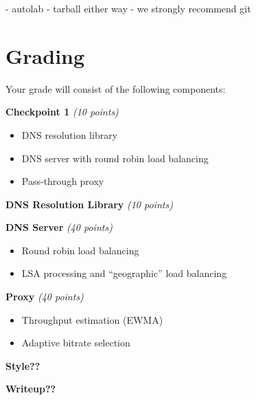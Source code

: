 \documentclass{article}
\begin{document}
- autolab
- tarball either way
- we strongly recommend git


\section{Grading}

Your grade will consist of the following components:

\smallskip \noindent \textbf{Checkpoint 1} \textit{(10 points)}
\begin{itemize}
	\item DNS resolution library
	\item DNS server with round robin load balancing
	\item Pass-through proxy
\end{itemize}

\smallskip \noindent \textbf{DNS Resolution Library} \textit{(10 points)}

\smallskip \noindent \textbf{DNS Server} \textit{(40 points)}
\begin{itemize}
	\item Round robin load balancing
	\item LSA processing and ``geographic'' load balancing
\end{itemize}

\smallskip \noindent \textbf{Proxy} \textit{(40 points)}
\begin{itemize}
	\item Throughput estimation (EWMA)
	\item Adaptive bitrate selection
\end{itemize}

\smallskip \noindent \textbf{Style??}

\smallskip \noindent \textbf{Writeup??}
\end{document}
